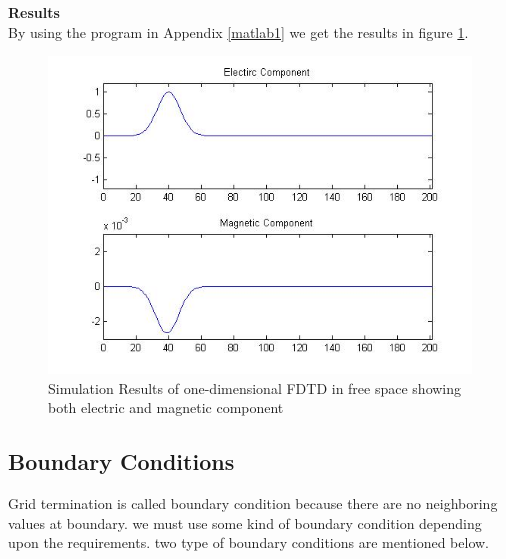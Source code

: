\textbf{Results}\\
By using the program in Appendix \ref{matlab1}
we get the results in figure \ref{fig:fdtdpc}.
\begin{figure}[htbp]
	\centering
		\includegraphics[width=5in]{Figures/free.jpg}
	\caption[Simulation Result of 1 dimensional FDTD in free space]{Simulation Results of one-dimensional FDTD in free space showing both electric and magnetic component}
	\label{fig:fdtdpc}
\end{figure}
\subsection{Boundary Conditions}
Grid termination is called boundary condition because there are no neighboring values at boundary. we must use some kind of boundary condition depending upon the requirements. two type of boundary conditions are mentioned below.
